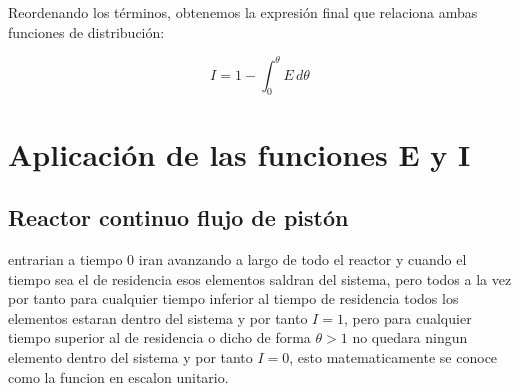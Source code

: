 \noindent Reordenando los términos, obtenemos la expresión final que relaciona ambas funciones de distribución:

\begin{equation}
    I = 1 - \int_{0}^{\theta} E \, d\theta    \label{eq:defI}
\end{equation}
\section{Aplicación de las funciones E y I}
\subsection{Reactor continuo flujo de pistón}
\noindent entrarian a tiempo 0 iran avanzando a largo de todo el reactor y cuando el tiempo sea el de residencia esos elementos saldran del sistema, pero todos a la vez por tanto para cualquier tiempo inferior al tiempo de residencia todos los elementos estaran dentro del sistema y por tanto $I=1$, pero para cualquier tiempo superior al de residencia o dicho de forma $\theta>1$ no quedara ningun elemento dentro del sistema y por tanto $I=0$, esto matematicamente se conoce como la funcion en escalon unitario.
